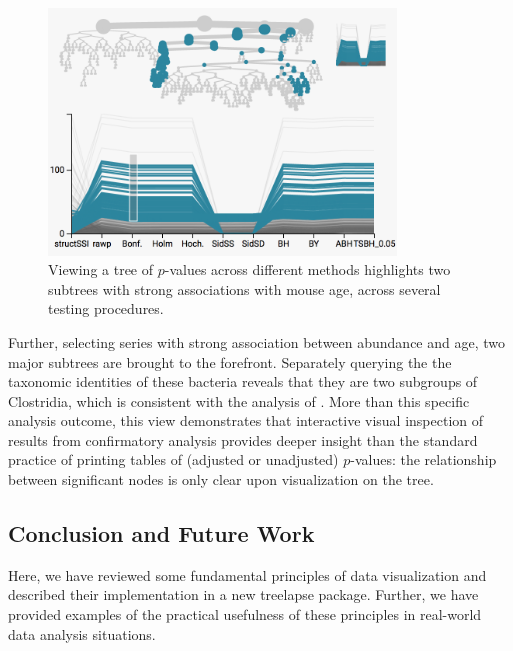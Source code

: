 \documentclass[12pt]{article}
\begin{document}
\begin{figure}

{\centering \includegraphics[width=350px]{figure/structssi}

}

\caption{Viewing a tree of $p$-values across different methods highlights two subtrees with strong associations with mouse age, across several testing procedures.}\label{fig:structssi}
\end{figure}

Further, selecting series with strong association between abundance and
age, two major subtrees are brought to the forefront. Separately
querying the the taxonomic identities of these bacteria reveals that they are
two subgroups of Clostridia, which is consistent with the analysis of
\citep{callahan2016bioconductor}. More than this specific analysis outcome, this
view demonstrates that interactive visual inspection of results from
confirmatory analysis provides deeper insight than the standard practice of
printing tables of (adjusted or unadjusted) $p$-values: the relationship between
significant nodes is only clear upon visualization on the tree.

\subsection*{Conclusion and Future Work}\label{conclusion}

Here, we have reviewed some fundamental principles of data visualization
and described their implementation in a new treelapse package. Further,
we have provided examples of the practical usefulness of these
principles in real-world data analysis situations.
\end{document}

